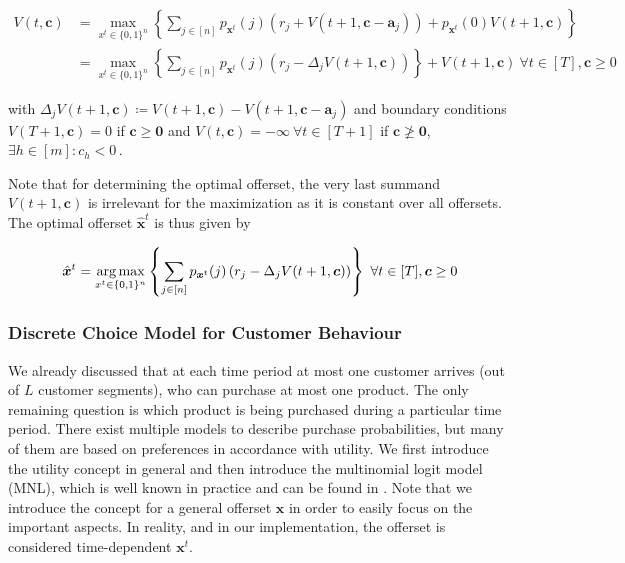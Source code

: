 
\begin{align}
V(t, \boldsymbol{c}) &= \max_{x^t \in \{0,1\}^n}\left\{ \sum_{j \in [n]} p_{\boldsymbol{x}^t}(j) \left( r_j + V(t+1, \boldsymbol{c} - \boldsymbol{a}_j) \right) + p_{\boldsymbol{x}^t}(0) V(t+1, \boldsymbol{c}) \right\} \label{eq:Bellman}\\
&= \max_{x^t \in \{0,1\}^n}\left\{ \sum_{j \in [n]} p_{\boldsymbol{x}^t}(j) \left( r_j - \Delta_j V(t+1, \boldsymbol{c}) \right) \right\} + V(t+1, \boldsymbol{c}) ~\forall t \in [T], \boldsymbol{c} \geq 0
\end{align}

with $\Delta_j V(t+1, \boldsymbol{c}) \coloneqq V(t+1, \boldsymbol{c}) - V(t+1, \boldsymbol{c} - \boldsymbol{a}_j)$ and boundary conditions $V(T+1, \boldsymbol{c}) = 0$ if $\boldsymbol{c} \geq \boldsymbol{0}$ and $V(t, \boldsymbol{c}) = - \infty ~\forall t \in [T+1]$ if $\boldsymbol{c} \ngeq \boldsymbol{0}$, \ie $\exists h \in [m]: c_h < 0$\,.

Note that for determining the optimal offerset, the very last summand $V(t+1, \boldsymbol{c})$ is irrelevant for the maximization as it is constant over all offersets. The optimal offerset $\hat{\boldsymbol{x}}^t$ is thus given by

\begin{align}
\hat{\boldsymbol{x}}^t = \operatorname*{arg\,max}_{x^t \in \{0,1\}^n}\left\{ \sum_{j \in [n]} p_{\boldsymbol{x}^t}(j) \left( r_j - \Delta_j V(t+1, \boldsymbol{c}) \right) \right\} ~\forall t \in [T], \boldsymbol{c} \geq 0\label{eq:DP-optOffer}
\end{align}


\subsubsection{Discrete Choice Model for Customer Behaviour}\label{sss:DCM}


We already discussed that at each time period at most one customer arrives (out of $L$ customer segments), who can purchase at most one product. The only remaining question is which product is being purchased during a particular time period. There exist multiple models to describe purchase probabilities, but many of them are based on preferences in accordance with utility. We first introduce the utility concept in general and then introduce the multinomial logit model (MNL), which is well known in practice and can be found \eg in \cite{Train.2009}. Note that we introduce the concept for a general offerset $\boldsymbol{x}$ in order to easily focus on the important aspects. In reality, and in our implementation, the offerset is considered time-dependent $\boldsymbol{x}^t$.

